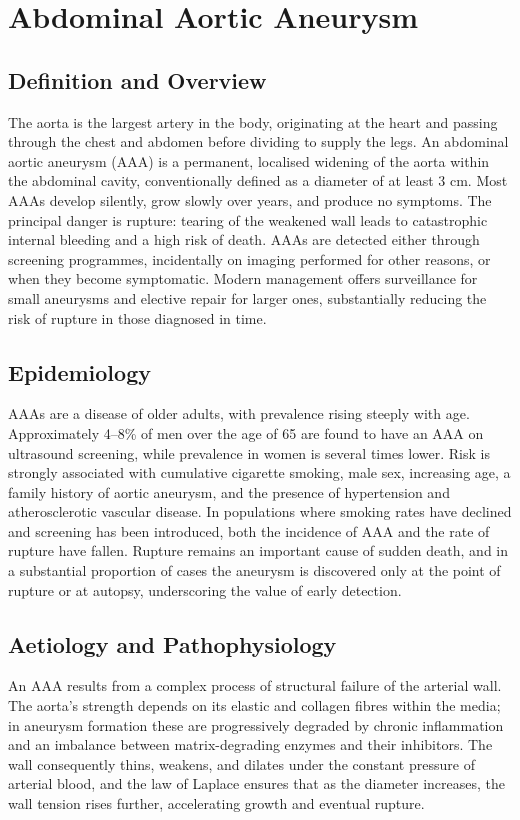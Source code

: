 \chapter{Abdominal Aortic Aneurysm}

\section*{Definition and Overview}
The aorta is the largest artery in the body, originating at the heart and passing through the chest and abdomen before dividing to supply the legs. An abdominal aortic aneurysm (AAA) is a permanent, localised widening of the aorta within the abdominal cavity, conventionally defined as a diameter of at least 3 cm. Most AAAs develop silently, grow slowly over years, and produce no symptoms. The principal danger is rupture: tearing of the weakened wall leads to catastrophic internal bleeding and a high risk of death. AAAs are detected either through screening programmes, incidentally on imaging performed for other reasons, or when they become symptomatic. Modern management offers surveillance for small aneurysms and elective repair for larger ones, substantially reducing the risk of rupture in those diagnosed in time.

\section*{Epidemiology}
AAAs are a disease of older adults, with prevalence rising steeply with age. Approximately 4--8\% of men over the age of 65 are found to have an AAA on ultrasound screening, while prevalence in women is several times lower. Risk is strongly associated with cumulative cigarette smoking, male sex, increasing age, a family history of aortic aneurysm, and the presence of hypertension and atherosclerotic vascular disease. In populations where smoking rates have declined and screening has been introduced, both the incidence of AAA and the rate of rupture have fallen. Rupture remains an important cause of sudden death, and in a substantial proportion of cases the aneurysm is discovered only at the point of rupture or at autopsy, underscoring the value of early detection.

\section*{Aetiology and Pathophysiology}
An AAA results from a complex process of structural failure of the arterial wall. The aorta's strength depends on its elastic and collagen fibres within the media; in aneurysm formation these are progressively degraded by chronic inflammation and an imbalance between matrix-degrading enzymes and their inhibitors. The wall consequently thins, weakens, and dilates under the constant pressure of arterial blood, and the law of Laplace ensures that as the diameter increases, the wall tension rises further, accelerating growth and eventual rupture.

